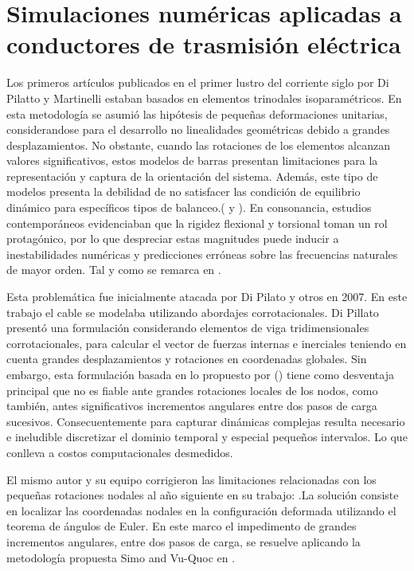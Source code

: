 \section{Simulaciones numéricas aplicadas a conductores de trasmisión eléctrica}\label{Sec:EA:AplicadasConductores}
Los primeros artículos publicados en el primer lustro del corriente siglo por Di Pilatto y Martinelli estaban basados en elementos trinodales isoparamétricos. En esta metodología se asumió las hipótesis de pequeñas deformaciones unitarias, considerandose para el desarrollo no linealidades geométricas debido a grandes desplazamientos. No obstante, cuando las rotaciones de los elementos alcanzan valores significativos, estos modelos de barras presentan limitaciones para la representación y captura de la orientación del sistema. Además, este tipo de modelos presenta la debilidad de no satisfacer las condición de equilibrio dinámico para específicos tipos de balanceo.(\cite{Martinelli2001} y \cite{Martinelli2004}). En consonancia, estudios contemporáneos evidenciaban que la rigidez flexional y torsional toman un rol protagónico, por lo que despreciar estas magnitudes puede inducir a inestabilidades numéricas y predicciones erróneas sobre las frecuencias naturales de mayor orden. Tal y como se remarca en \cite{koh2004dynamic}.

Esta problemática fue inicialmente atacada por Di Pilato y otros en 2007. En este trabajo el cable se modelaba utilizando abordajes corrotacionales. Di Pillato presentó una formulación considerando elementos de viga tridimensionales corrotacionales, para calcular el vector de fuerzas internas e inerciales teniendo en cuenta grandes desplazamientos y rotaciones en coordenadas globales. Sin embargo, esta formulación basada en lo propuesto por (\cite{oran1973tangent}) tiene como desventaja principal que no es fiable ante grandes rotaciones locales de los nodos, como también, antes significativos incrementos angulares entre dos pasos de carga sucesivos. Consecuentemente para capturar dinámicas complejas resulta necesario e ineludible discretizar el dominio temporal y especial pequeños intervalos. Lo que conlleva a costos computacionales desmedidos.

El mismo autor y su equipo corrigieron las limitaciones relacionadas con los pequeñas rotaciones nodales al año siguiente en su trabajo: \cite{di2008corotational}.La solución consiste en localizar las coordenadas nodales en la configuración deformada utilizando el teorema de ángulos de Euler. En este marco el impedimento de grandes incrementos angulares, entre dos pasos de carga, se resuelve aplicando la metodología propuesta Simo and Vu-Quoc en \cite{simo1988dynamics}.  


